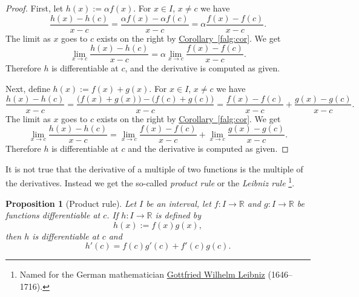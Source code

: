 \documentclass[12pt]{book}
\newcommand{\R}{{\mathbb{R}}}
\newcommand{\myindex}[1]{#1\index{#1}}
\theoremstyle{plain}
\newtheorem{prop}[thm]{Proposition}
\theoremstyle{remark}
\theoremstyle{definition}
\theoremstyle{exercise}
\theoremstyle{example}
\newcommand{\corref}[1]{\hyperref[#1]{Corollary~\ref*{#1}}}
\begin{document}
\begin{proof}
First, let $h(x) := \alpha f(x)$.
For $x \in I$, $x \not= c$ we have
\begin{equation*}
\frac{h(x)-h(c)}{x-c} =
\frac{\alpha f(x) - \alpha f(c)}{x-c}
=
\alpha \frac{f(x) - f(c)}{x-c} .
\end{equation*}
The limit as $x$ goes to $c$ exists on the right
by \corref{falg:cor}.  We get
\begin{equation*}
\lim_{x\to c}\frac{h(x)-h(c)}{x-c} =
\alpha \lim_{x\to c} \frac{f(x) - f(c)}{x-c} .
\end{equation*}
Therefore $h$ is differentiable at $c$,
and the derivative is computed as given.

Next, define $h(x) := f(x)+g(x)$.
For $x \in I$, $x \not= c$ we have
\begin{equation*}
\frac{h(x)-h(c)}{x-c} =
\frac{\bigl(f(x) + g(x)\bigr) - \bigl(f(c) + g(c)\bigr)}{x-c}
=
\frac{f(x) - f(c)}{x-c}
+
\frac{g(x) - g(c)}{x-c} .
\end{equation*}
The limit as $x$ goes to $c$ exists on the right
by \corref{falg:cor}.  We get
\begin{equation*}
\lim_{x\to c}\frac{h(x)-h(c)}{x-c} =
\lim_{x\to c} \frac{f(x) - f(c)}{x-c}
+
\lim_{x\to c}\frac{g(x) - g(c)}{x-c} .
\end{equation*}
Therefore $h$ is differentiable at $c$
and the derivative is computed as given.
\end{proof}

It is not true that the derivative of a multiple of two functions is
the multiple of the derivatives.  Instead we get the so-called \emph{product
rule} or the \emph{\myindex{Leibniz rule}}%
\footnote{Named for the German mathematician
\href{http://en.wikipedia.org/wiki/Leibniz}{Gottfried Wilhelm Leibniz}
(1646--1716).}.

\begin{prop}[Product rule]
Let $I$ be an interval, let
$f \colon I \to \R$ and $g \colon I \to \R$ be 
functions differentiable at $c$.  If $h \colon I \to \R$
is defined by
\begin{equation*}
h(x) := f(x) g(x) ,
\end{equation*}
then $h$ is differentiable at $c$ and
\begin{equation*}
h'(c) = f(c) g'(c) + f'(c) g(c) .
\end{equation*}
\end{prop}
\end{document}
